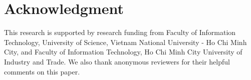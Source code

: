 \documentclass{llncs}
\begin{document}
\section*{Acknowledgment}

This research is supported by research funding from Faculty of Information Technology, 
University of Science, Vietnam National University - Ho Chi Minh City, and Faculty of Information Technology,  Ho Chi Minh City University of Industry and Trade.
We also thank anonymous reviewers for their helpful comments on this paper.
 

\end{document}

